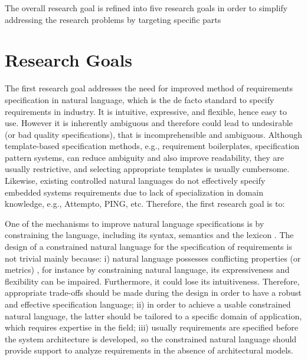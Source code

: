 The overall research goal is refined into five research goals in order to simplify addressing the research problems by targeting specific parts

\section{Research Goals}\label{research_challenges}
The first research goal addresses the need for improved method of requirements specification in natural language, which is the de facto standard to specify requirements in industry. It is intuitive, expressive, and flexible, hence easy to use. However it is inherently ambiguous and therefore could lead to undesirable (or bad quality specifications), that is incomprehensible and ambiguous. Although template-based specification methods, e.g., requirement boilerplates, specification pattern systems, can reduce ambiguity and also improve readability, they are usually restrictive, and selecting appropriate templates is usually cumbersome. Likewise, existing controlled natural languages do not effectively specify embedded systems requirements due to lack of specialization in domain knowledge, e.g., Attempto, PING, etc. Therefore, the first research goal is to:
\setcounter{rgcounter}{1}
\begin{researchgoal}
\end{researchgoal}

One of the mechanisms to improve natural language specifications is by constraining the language, including its syntax, semantics and the lexicon \cite{Kuhn2014ALanguages}. The design of a constrained natural language for the specification of requirements is not trivial mainly because: i) natural language possesses conflicting properties (or metrics) \cite{ieereqspecstandard}, for instance by constraining natural language, its expressiveness and flexibility \cite{Myachykov2013SyntacticRussian} can be impaired. Furthermore, it could lose its intuitiveness. Therefore, appropriate trade-offs should be made during the design in order to have a robust and effective specification language; ii) in order to achieve a usable constrained natural language, the latter should be tailored to a specific domain of application, which requires expertise in the field; iii) usually requirements are specified before the system architecture is developed, so the constrained natural language should provide support to analyze requirements in the absence of architectural models.

